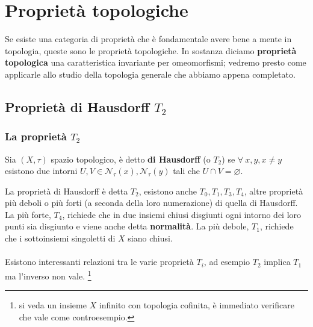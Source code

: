 \chapter{Proprietà topologiche}
Se esiste una categoria di proprietà che è fondamentale avere bene a mente in topologia, queste sono le proprietà topologiche. 
In sostanza diciamo \textbf{proprietà topologica} una caratteristica invariante per omeomorfismi; vedremo presto come applicarle allo studio della topologia generale che abbiamo appena completato.



\section{Proprietà di Hausdorff $T_2$}
 \subsection{\textcolor{TopGener}{\textbf{La proprietà $T_2$}}}
 
 
 
\begin{definition}
	Sia $(X, \tau)$ spazio topologico, è detto \textbf{di Hausdorff} (o $T_2$) se $\forall \ x, y, x \neq y$ esistono due intorni $U, V \in \mathcal{N}_\tau(x),\mathcal{N}_\tau(y)$ tali che $U \cap V = \varnothing$.
\end{definition} 


La proprietà di Hausdorff è detta $T_2$,  esistono anche $T_0, T_1, T_3, T_4$, altre proprietà più deboli o più forti (a seconda della loro numerazione) di quella di Hausdorff. \\ La più forte, $T_4$, richiede che in due insiemi chiusi disgiunti ogni intorno dei loro punti sia disgiunto e viene anche detta \textbf{normalità}. La più debole, $T_1$, richiede che i sottoinsiemi singoletti di $X$ siano chiusi.\\ \\ Esistono interessanti relazioni tra le varie proprietà $T_i$, ad esempio $T_2$ implica $T_1$ ma l'inverso non vale. \footnote{si veda un insieme $X$ infinito con topologia cofinita, è immediato verificare che vale come controesempio.}

